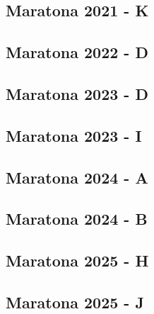 \documentclass[10pt, a4paper, twocolumn, landscape]{article}
\begin{document}
\subsection{Maratona 2021 - K}

\vspace{0.2cm}
\subsection{Maratona 2022 - D}

\vspace{0.2cm}
\subsection{Maratona 2023 - D}

\vspace{0.2cm}
\subsection{Maratona 2023 - I}

\vspace{0.2cm}
\subsection{Maratona 2024 - A}

\vspace{0.2cm}
\subsection{Maratona 2024 - B}

\vspace{0.2cm}
\subsection{Maratona 2025 - H}

\vspace{0.2cm}
\subsection{Maratona 2025 - J}

\vspace{0.2cm}
\clearpage
\end{document}
